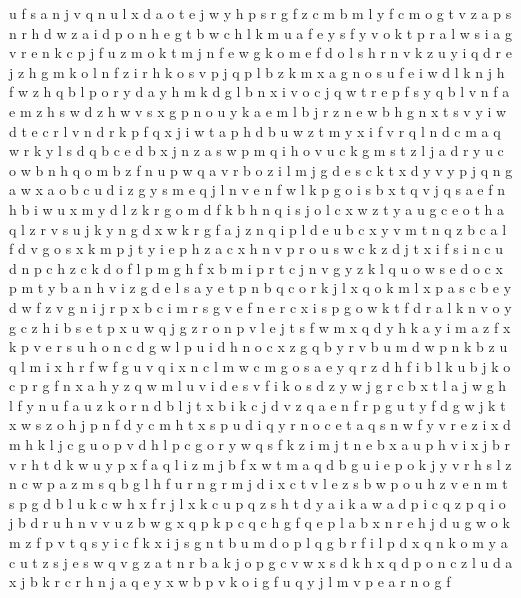 \documentclass{article}
\begin{document}
u f s a n j
v q n u l x d a o t e j w y h p s r g f z c m b
m
l y f c m o g t v z a p s n r h d w
z a i d p o n h e
g t b w c h l k m u a f e y
s f y v o k t p r a
l w s i a g v r e n k c p j f u z m
o k t m j n f e w
g k o m
e f d o l s h r n v k z u y i
q d r e j z h g m k o
l n f z i r h k o s v p
j q p l b z k m x a g n o s u f e i w d
l
k n j h
f w z h q b l p o r y d
a y h m k d g l b n x i v o c j q w t r e p f s
y q b l v n f a e m z h s w
d z h w v s x g p n o u y k a e m l b j r
z n e w b h g
n x t
s v y i w d t e c r l
v n d r k p f q x j i w t
a p h d b u w z t m y x i f v r q l n
d c m a
q w
r k y l s d q b c e
d b x j n z a s w p m q i h o v u c k g
m s t z l j a d r y u c o w b n h q
o m b z
f n u p w q a v r b o z i l m j g d e s c k t x
d y
v y p j q n g a
w x a o b c u d i z g y s m e q j l n v
e n f w l k p g o i s b x t q v
j q s a e f n h b i w u x m y d l z k r g o
m d f k b h n q i s j o l c x w z t y a u g
c e o t h a q l z r v s u j k y n g d x
w k r g f a j z n q i p l d e u b c x y v m t
n q z b c a l f d v g o s x k m p j t y i e
p h z a c x
h n v p r o u s w c k z d j t x i f
s i n c u d
n p c h z
c k d o f l p m g
h f x b m i p r t c j n v g y z k l q u o w s e d
o c x p m t y b a n h v i z g d e l s
a y e t p n b q c o r k j l x
q o k m l x p a s c b e y d w f z v g n i j r
p x b c i m r s g v e f
n e r c x i s p g o w k t f
d r a l k n v o y g c z h i b s e t p x u w q j
g
z r o n p v l e j t s f w m x q d y h k a
y i m a z f x k p v e r s u h o n c d g w l
p u i d h n o c x z g q b y r
v b u m d w p n
k b z u q l m i x h r f w
f g u v q i x n
c l m
w c m g o s a e y q r z d h f i b l k u
b j k o c p r g f n x a h y z q w m l u v i d e s
v f i k o s d z y w j g r c b x t l a
j w g h l f y n u
f a u z k o r n d b l j t
x b
i k c j d v z q a e n f r p g u t y
f d g w j k t
x w s z o h j p n f d y c m
h t x s p u d i q y r n o c e
t a q s n w f y v r e z i x d m h k l j c g u o p
v d h l p c g o r y w q s f k z i m j t n e b x a u
p h v i x j b r
v r h t d k w u y p x f a q l i z m j b
f x w t m a q d b g u i e p o k j y v r h s l z n c
w p a z m s q b g l h
f u r
n g r m j d i x c t v l e z s b w p o u h
z v e n m t s p g d b l u k c w h x f r j
l x k c u p q z s h t d y a i
k a w
a d p i c q z
p q i o j b d r u h n v
v u z b w g x q p k
p c q
c h g f q e
p
l a b x n r e h j d u g w o k m z f p v t q s y i
c f k x i j s g n t b u m d o p l q
g b r f i l p d x q n k o m y a c u t z s j e
s w q v g z a t
n r b a k j o p g c v w x s d
k h x q
d p o n c z l
u d a x j b k r
c r h n j a q e y x w b p v k o i g f u
q y j l m v p e a r n o g f
\end{document}
